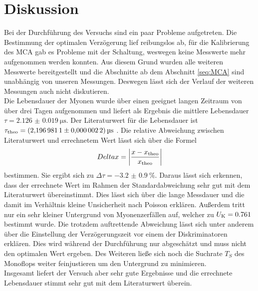 \newpage
\section{Diskussion}

\noindent
Bei der Durchführung des Versuchs sind ein paar Probleme aufgetreten. 
Die Bestimmung der optimalen Verzögerung lief reibungslos ab, für die Kalibrierung des MCA gab es Probleme mit der Schaltung, weswegen keine Messwerte mehr aufgenommen werden konnten.
Aus diesem Grund wurden alle weiteren Messwerte bereitgestellt und die Abschnitte ab dem Abschnitt \ref{seq:MCA} sind unabhängig von unseren Messungen.
Deswegen lässt sich der Verlauf der weiteren Messungen auch nicht diskutieren.\\
Die Lebensdauer der Myonen wurde über einen geeignet langen Zeitraum von über drei Tagen aufgenommen und liefert als Ergebnis die mittlere Lebensdauer $\tau = \SI{2.126(0019)}{\micro\second}$.
Der Literaturwert für die Lebensdauer ist $\tau_\t{theo} = \SI{2.1969811(00000022)}{\micro\second}$ \cite{PDG}.
Die relative Abweichung zwischen Literaturwert und errechnetem Wert lässt sich über die Formel
\begin{equation*}
    \\Delta x = \left| \frac{x - x_\t{theo}}{x_\t{theo}} \right|
\end{equation*}
bestimmen. Sie ergibt sich zu $\Delta \tau =\SI{-3.2(09)}{\percent} $. Daraus lässt sich erkennen, dass der errechnete Wert im Rahmen der Standardabweichung sehr gut mit dem Literaturwert übereinstimmt.
Dies lässt sich über die lange Messdauer und die damit im Verhältnis kleine Unsicherheit nach Poisson erklären. 
Außerdem tritt nur ein sehr kleiner Untergrund von Myonenzerfällen auf, welcher zu $U_\t{K} = 0.761$ bestimmt wurde.
Die trotzdem auftrettende Abweichung lässt sich unter anderem über die Einstellung der Verzögerungszeit vor einem der Diskriminatoren erklären. 
Dies wird während der Durchführung nur abgeschätzt und muss nicht den optimalen Wert ergeben. 
Des Weiteren ließe sich noch die Suchrate $T_S$ des Monoflops weiter feinjustieren um den Untergrund zu minimieren.\\ 
Insgesamt liefert der Versuch aber sehr gute Ergebnisse und die errechnete Lebensdauer stimmt sehr gut mit dem Literaturwert überein.
